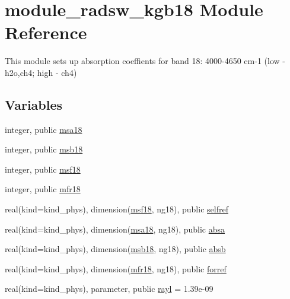 \hypertarget{namespacemodule__radsw__kgb18}{}\section{module\+\_\+radsw\+\_\+kgb18 Module Reference}
\label{namespacemodule__radsw__kgb18}


This module sets up absorption coeffients for band 18\+: 4000-\/4650 cm-\/1 (low -\/ h2o,ch4; high -\/ ch4)  


\subsection*{Variables}
\begin{DoxyCompactItemize}
\item 
integer, public \hyperlink{namespacemodule__radsw__kgb18_a48213008c9ed8f94aaad4ef327d38583}{msa18}
\item 
integer, public \hyperlink{namespacemodule__radsw__kgb18_ad2e52d9beb90328236a351926d1a3432}{msb18}
\item 
integer, public \hyperlink{namespacemodule__radsw__kgb18_a1d74002f71710887e45df89d3897a10a}{msf18}
\item 
integer, public \hyperlink{namespacemodule__radsw__kgb18_a9fa8140413e7ec769baea4f207e58393}{mfr18}
\item 
real(kind=kind\+\_\+phys), dimension(\hyperlink{namespacemodule__radsw__kgb18_a1d74002f71710887e45df89d3897a10a}{msf18}, ng18), public \hyperlink{namespacemodule__radsw__kgb18_a488f807878d909b8f69457b0d7d8ac6a}{selfref}
\item 
real(kind=kind\+\_\+phys), dimension(\hyperlink{namespacemodule__radsw__kgb18_a48213008c9ed8f94aaad4ef327d38583}{msa18}, ng18), public \hyperlink{namespacemodule__radsw__kgb18_a8a7787776bd057b1815e92a5f58b9cac}{absa}
\item 
real(kind=kind\+\_\+phys), dimension(\hyperlink{namespacemodule__radsw__kgb18_ad2e52d9beb90328236a351926d1a3432}{msb18}, ng18), public \hyperlink{namespacemodule__radsw__kgb18_a858680db0ee5e9a599639844a91f8f06}{absb}
\item 
real(kind=kind\+\_\+phys), dimension(\hyperlink{namespacemodule__radsw__kgb18_a9fa8140413e7ec769baea4f207e58393}{mfr18}, ng18), public \hyperlink{namespacemodule__radsw__kgb18_a0efc293c91de3d17b29ed713ff09d7a9}{forref}
\item 
real(kind=kind\+\_\+phys), parameter, public \hyperlink{namespacemodule__radsw__kgb18_a9cd3f07e259e4982c7ef2889fee6cccb}{rayl} = 1.\+39e-\/09
\end{DoxyCompactItemize}


